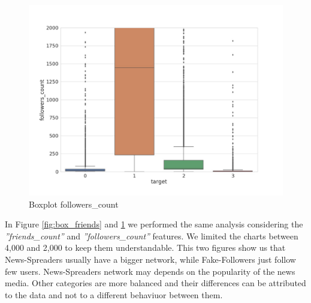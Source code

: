 \begin{figure}
	\centering
	\includegraphics[width=\columnwidth]{chapter3/figure/boxplot_followers.jpg}
	\caption{Boxplot followers\_count}
	
	\label{fig:box_followers}
\end{figure}
In Figure \ref{fig:box_friends} and \ref{fig:box_followers} we performed the same analysis considering the \emph{''friends\_count''} and \emph{''followers\_count''} features. We limited the charts between 4,000 and 2,000 to keep them understandable. This two figures show us that News-Spreaders usually have a bigger network, while Fake-Followers just follow few users. News-Spreaders network may depends on the popularity of the news media. Other categories are more balanced and their differences can be attributed to the data and not to a different behaviuor between them.